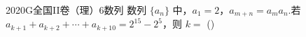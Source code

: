 
\begin{problem}{2020}{G}{全国II卷（理）}{6}{数列}
数列 $ \{a_n\} $ 中，$ a_1 = 2 $，$ a_{m+n} = a_m a_n $.若 $ a_{k+1} + a_{k+2} + \cdots + a_{k+10} = 2^{15} - 2^5 $，则 $ k = $ (\hspace{1cm})
\begin{choices}
\end{choices}
\end{problem}

\begin{answer}

\end{answer}

\begin{solutions}

\end{solutions}